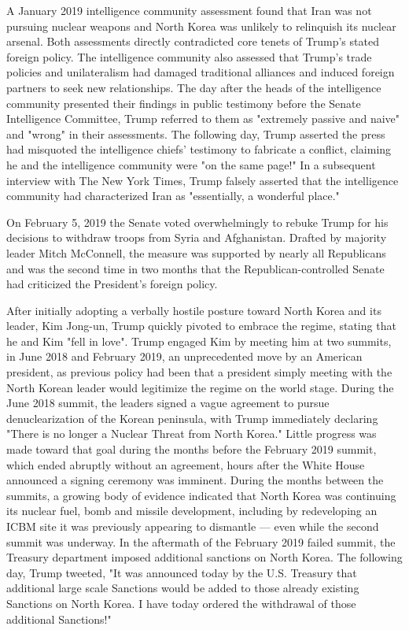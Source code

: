 A January 2019 intelligence community assessment found that Iran was not
pursuing nuclear weapons and North Korea was unlikely to relinquish its
nuclear arsenal. Both assessments directly contradicted core tenets of
Trump's stated foreign policy. The intelligence community also assessed
that Trump's trade policies and unilateralism had damaged traditional
alliances and induced foreign partners to seek new relationships. The
day after the heads of the intelligence community presented their
findings in public testimony before the Senate Intelligence Committee,
Trump referred to them as "extremely passive and naive" and "wrong" in
their assessments. The following day, Trump asserted the press had
misquoted the intelligence chiefs' testimony to fabricate a conflict,
claiming he and the intelligence community were "on the same page!" In a
subsequent interview with The New York Times, Trump falsely asserted
that the intelligence community had characterized Iran as "essentially,
a wonderful place."

On February 5, 2019 the Senate voted overwhelmingly to rebuke Trump for
his decisions to withdraw troops from Syria and Afghanistan. Drafted by
majority leader Mitch McConnell, the measure was supported by nearly all
Republicans and was the second time in two months that the
Republican-controlled Senate had criticized the President's foreign
policy.

After initially adopting a verbally hostile posture toward North Korea
and its leader, Kim Jong-un, Trump quickly pivoted to embrace the
regime, stating that he and Kim "fell in love". Trump engaged Kim by
meeting him at two summits, in June 2018 and February 2019, an
unprecedented move by an American president, as previous policy had been
that a president simply meeting with the North Korean leader would
legitimize the regime on the world stage. During the June 2018 summit,
the leaders signed a vague agreement to pursue denuclearization of the
Korean peninsula, with Trump immediately declaring "There is no longer a
Nuclear Threat from North Korea." Little progress was made toward that
goal during the months before the February 2019 summit, which ended
abruptly without an agreement, hours after the White House announced a
signing ceremony was imminent. During the months between the summits, a
growing body of evidence indicated that North Korea was continuing its
nuclear fuel, bomb and missile development, including by redeveloping an
ICBM site it was previously appearing to dismantle --- even while the
second summit was underway. In the aftermath of the February 2019 failed
summit, the Treasury department imposed additional sanctions on North
Korea. The following day, Trump tweeted, "It was announced today by the
U.S. Treasury that additional large scale Sanctions would be added to
those already existing Sanctions on North Korea. I have today ordered
the withdrawal of those additional Sanctions!"

